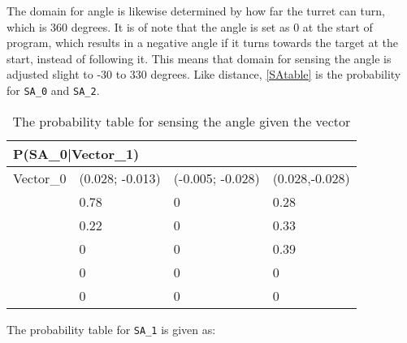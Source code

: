 
The domain for angle is likewise determined by how far the turret can turn,
which is 360 degrees. It is of note that the angle is set as 0 at the start of
program, which results in a negative angle if it turns towards the target at the
start, instead of following it. This means that domain for sensing the angle is
adjusted slight to -30 to 330 degrees. Like distance, \autoref{SAtable} is
the probability for \texttt{SA\_0} and \texttt{SA\_2}.
\begin{center}
\begin{table}[H]
\label{SAtable}
\begin{tabular}{|l|l|l|l|}
\hline
\multicolumn{4}{|l|}{P(SA\_0|Vector\_1)} \\ \hline
Vector\_0     & (0.028; -0.013) & (-0.005; -0.028) & (0.028,-0.028)  \\\hline   
[-30 - 0]   & 0.78 & 0    & 0.28    \\ \hline 
[0 - 30]    & 0.22 & 0    & 0.33    \\ \hline
[30 - 60]   & 0    & 0    & 0.39    \\ \hline
[60 - 90]   & 0    & 0    & 0    \\ \hline
[90- 330]   & 0    & 0    & 0    \\ \hline
\end{tabular}
\caption{The probability table for sensing the angle given the vector}
\end{table}
\end{center}

The probability table for \texttt{SA\_1} is given as:

